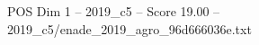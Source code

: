 \begin{textsample}{POS Dim 1 – 2019\_c5 – Score 19.00 – 2019\_c5/enade\_2019\_agro\_96d666036e.txt}
\end{textsample}
